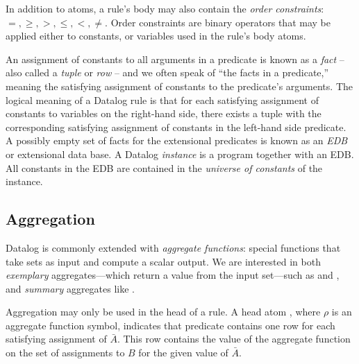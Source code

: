 In addition to atoms, a rule's body may also contain the {\em order
constraints}: $=, \geq, >, \leq, <, \neq$.  Order constraints are binary
operators that may be applied either to constants, or variables used in the
rule's body atoms.

An assignment of constants to all arguments in a predicate is known as a {\em
fact} -- also called a {\em tuple} or {\em row} -- and we often speak of ``the
facts in a predicate,'' meaning the satisfying assignment of constants to the
predicate's arguments.  The logical meaning of a Datalog rule is that for each
satisfying assignment of constants to variables on the right-hand side, there
exists a tuple with the corresponding satisfying assignment of constants in the
left-hand side predicate.
A possibly empty set of facts for the extensional predicates is known as an
{\em EDB} or extensional data base.  A Datalog {\em instance} is a program
together with an EDB.  All constants in the EDB are contained in the {\em
universe of constants} of the instance.

\subsection{Aggregation}

Datalog is commonly extended with {\em aggregate functions}: special functions
that take sets as input and compute a scalar output. %
We are interested in both {\em exemplary} aggregates---which return a value
from the input set---such as  and , and {\em summary}
aggregates like .

Aggregation may only be used in the head of a rule.  A head atom
, where $\rho$ is an aggregate function symbol,
indicates that predicate  contains one row for each satisfying
assignment of $\bar{A}$.  This row contains the value of the aggregate function
on the set of assignments to $B$ for the given value of $\bar{A}$.

